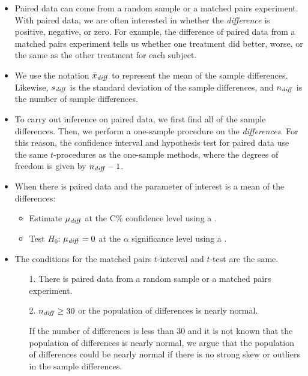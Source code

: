\begin{itemize} 
\item Paired data can come from a {random sample} or a {matched pairs experiment}.   With paired data, we are often interested in whether the \emph{difference} is positive, negative, or zero.  For example, the difference of paired data from a matched pairs experiment tells us whether one treatment did better, worse, or the same as the other treatment for each subject.

\item We use the notation $\bar{x}_{\text{\emph{diff}}}$ to represent the mean of the sample differences.  Likewise, $s_{\text{\emph{diff}}}$ is the standard deviation of the sample differences, and $n_{\text{\emph{diff}}}$ is the number of sample differences.


\item To carry out inference on paired data, we first find all of the sample differences.  Then, we perform a one-sample procedure on the \emph{differences}.  For this reason, the confidence interval and hypothesis test for paired data use the same $t$-procedures as the one-sample methods, where the degrees of freedom is given by $n_{\text{\emph{diff}}}-1$.


\item When there is paired data and the parameter of interest is a mean of the differences:  
\begin{itemize}
\item Estimate $\mu_{\text{\emph{diff}}}$ at the C\% confidence level using a .
\item Test $H_0$: $\mu_{\text{\emph{diff}}}=0$ at the $\alpha$ significance level using a . 
\end{itemize}

\item The conditions for the matched pairs $t$-interval and $t$-test are the same.  
\begin{itemize}
\item[1.]  There is paired data from a random sample or a matched pairs experiment.
\item[2.]  $n_{\text{\emph{diff}}}\ge 30$ or the population of differences is nearly normal.
 \item[] If the number of differences is less than 30 and it is not known that the population of differences is nearly normal, we argue that the population of differences could be nearly normal if there is no strong skew or outliers in the sample differences.
\end{itemize}



\end{itemize}
